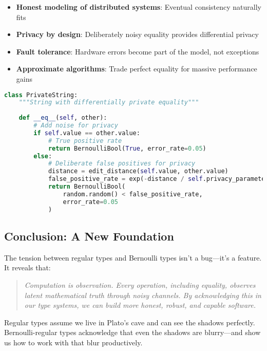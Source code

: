 \begin{itemize}
\item \textbf{Honest modeling of distributed systems}: Eventual consistency naturally fits
\item \textbf{Privacy by design}: Deliberately noisy equality provides differential privacy
\item \textbf{Fault tolerance}: Hardware errors become part of the model, not exceptions
\item \textbf{Approximate algorithms}: Trade perfect equality for massive performance gains
\end{itemize}

\begin{example}
\begin{lstlisting}[language=Python]
class PrivateString:
    """String with differentially private equality"""
    
    def __eq__(self, other):
        # Add noise for privacy
        if self.value == other.value:
            # True positive rate
            return BernoulliBool(True, error_rate=0.05)
        else:
            # Deliberate false positives for privacy
            distance = edit_distance(self.value, other.value)
            false_positive_rate = exp(-distance / self.privacy_parameter)
            return BernoulliBool(
                random.random() < false_positive_rate,
                error_rate=0.05
            )
\end{lstlisting}
\end{example}

\subsection{Conclusion: A New Foundation}

The tension between regular types and Bernoulli types isn't a bug—it's a feature. It reveals that:

\begin{quote}
\textit{Computation is observation. Every operation, including equality, observes latent mathematical truth through noisy channels. By acknowledging this in our type systems, we can build more honest, robust, and capable software.}
\end{quote}

Regular types assume we live in Plato's cave and can see the shadows perfectly. Bernoulli-regular types acknowledge that even the shadows are blurry—and show us how to work with that blur productively.